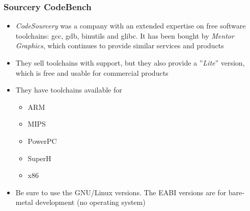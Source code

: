 \begin{frame}
  \frametitle{Sourcery CodeBench}
  \begin{itemize}
  \item {\em CodeSourcery} was a company with an extended expertise
    on free software toolchains: gcc, gdb, binutils and glibc. It has
    been bought by {\em Mentor Graphics}, which continues to provide
    similar services and products
  \item They sell toolchains with support, but they also provide a
    ”{\em Lite}” version, which is free and usable for commercial
    products
  \item They have toolchains available for
    \begin{itemize}
    \item ARM
    \item MIPS
    \item PowerPC
    \item SuperH
    \item x86
    \end{itemize}
  \item Be sure to use the GNU/Linux versions. The EABI versions are
    for bare-metal development (no operating system)
  \end{itemize}
\end{frame}

